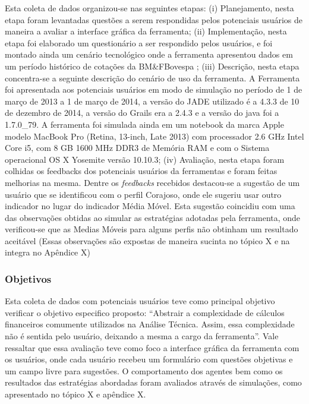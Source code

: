 Esta coleta de dados organizou-se nas seguintes etapas: (i) Planejamento, nesta etapa foram levantadas questões a serem respondidas pelos potenciais usuários de maneira a avaliar a interface gráfica da ferramenta; (ii) Implementação, nesta etapa foi elaborado um questionário a ser respondido pelos usuários, e foi montado ainda um cenário tecnológico onde a ferramenta apresentou dados em um período histórico de cotações da BM\&FBovespa ; (iii) Descrição, nesta etapa concentra-se a seguinte descrição do cenário de uso da ferramenta. A Ferramenta foi apresentada aos potenciais usuários em modo de simulação no período de 1 de março de 2013 a 1 de março de 2014, a versão do JADE utilizado é a 4.3.3 de 10 de dezembro de 2014, a versão do Grails era a 2.4.3 e a versão do java foi a 1.7.0\_79. A ferramenta foi simulada ainda em um notebook da marca Apple modelo MacBook Pro (Retina, 13-inch, Late 2013) com processador 2.6 GHz Intel Core i5, com 8 GB 1600 MHz DDR3 de Memória RAM e com o Sistema operacional OS X Yosemite versão 10.10.3; (iv) Avaliação, nesta etapa foram colhidas os feedbacks dos potenciais usuários da ferramentas e foram feitas melhorias na mesma. Dentre os \textit{feedbacks} recebidos destacou-se a sugestão de um usuário que se identificou com o perfil Corajoso, onde ele sugeriu usar outro indicador no lugar do indicador Média Móvel. Esta sugestão coincidiu com uma das observações obtidas ao simular as estratégias adotadas pela ferramenta, onde verificou-se que as Medias Móveis para alguns perfis não obtinham um resultado aceitável (Essas observações são expostas de maneira sucinta no tópico X e na integra no Apêndice X)

\subsubsection{Objetivos}

Esta coleta de dados com potenciais usuários teve como principal objetivo verificar  o objetivo especifico proposto: “Abstrair a complexidade de cálculos financeiros comumente utilizados na Análise Técnica. Assim, essa complexidade não é sentida pelo usuário, deixando a mesma a cargo da ferramenta”. Vale ressaltar que essa avaliação teve como foco a interface gráfica da ferramenta com os usuários, onde cada usuário recebeu um formulário com questões objetivas e um campo livre para sugestões. O comportamento dos agentes bem como os resultados das estratégias abordadas foram avaliados através de simulações, como apresentado no tópico X e apêndice X.

